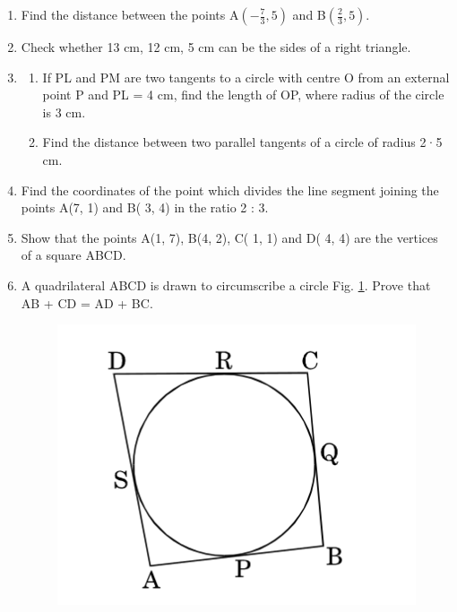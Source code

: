 \documentclass{article}
\begin{document}
\begin{enumerate}
		
		\item Find the distance between the points A$(-\frac{7}{3},5)$ and B$(\frac{2}{3},5)$.
		
		\item Check whether 13 cm, 12 cm, 5 cm can be the sides of a right triangle.
		
		\item
		\begin{enumerate}
			\item If PL and PM are two tangents to a circle with centre O from an external point P and PL = 4 cm, find the length of OP, where radius of the circle is 3 cm.
			
			\item Find the distance between two parallel tangents of a circle of radius 2·5 cm. 
		\end{enumerate}
		
		\item Find the coordinates of the point which divides the line segment joining the points A(7, 1) and B( 3, 4) in the ratio 2 : 3. 
		
		\item Show that the points A(1, 7), B(4, 2), C( 1, 1) and D( 4, 4) are the vertices of a square ABCD. 
		
		\item A quadrilateral ABCD is drawn to circumscribe a circle Fig. \ref{fig:leaf}. Prove that AB + CD = AD + BC.

		\begin{figure}[h]
        \centering
        \includegraphics[scale=0.3]{figs/2.jpg}
        \caption{}
        \label{fig:leaf}
        \end{figure}
            

\end{enumerate}
\end{document}
